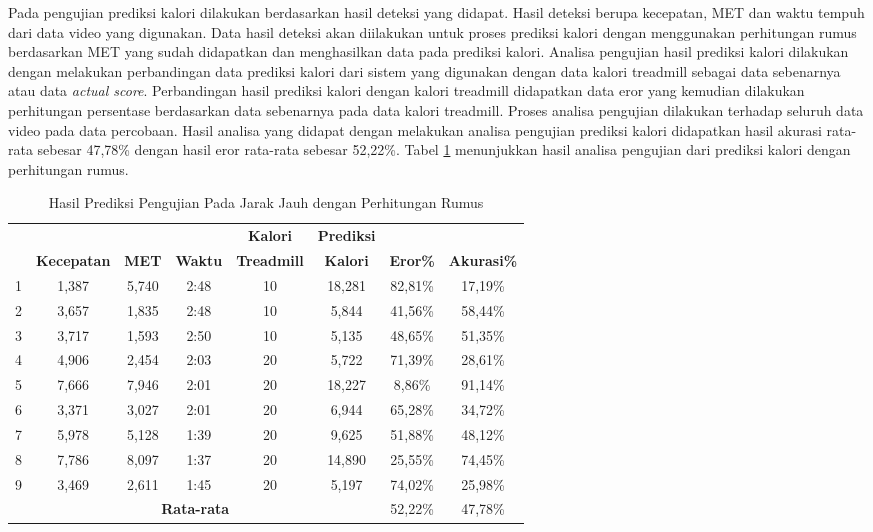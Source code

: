 Pada pengujian prediksi kalori dilakukan berdasarkan hasil deteksi yang didapat. Hasil deteksi berupa kecepatan, MET dan waktu tempuh dari data video yang digunakan. Data hasil deteksi akan diilakukan untuk proses prediksi kalori dengan menggunakan perhitungan rumus berdasarkan MET yang sudah didapatkan dan menghasilkan data pada prediksi kalori. Analisa pengujian hasil prediksi kalori dilakukan dengan melakukan perbandingan data prediksi kalori dari sistem yang digunakan dengan data kalori treadmill sebagai data sebenarnya atau data \emph{actual score}. Perbandingan hasil prediksi kalori dengan kalori treadmill didapatkan data eror yang kemudian dilakukan perhitungan persentase berdasarkan data sebenarnya pada data kalori treadmill. Proses analisa pengujian dilakukan terhadap seluruh data video pada data percobaan. Hasil analisa yang didapat dengan melakukan analisa pengujian prediksi kalori didapatkan hasil akurasi rata-rata sebesar 47,78\% dengan hasil eror rata-rata sebesar 52,22\%. Tabel \ref{tb:PengujianJarakJauhAnalisaPrediksiPerhitungan} menunjukkan hasil analisa pengujian dari prediksi kalori dengan perhitungan rumus.

\begin{longtable}{|c|c|c|c|c|c|c|c|}
  \caption{Hasil Prediksi Pengujian Pada Jarak Jauh dengan Perhitungan Rumus}
  \label{tb:PengujianJarakJauhAnalisaPrediksiPerhitungan}                                   \\
  \hline
  \rowcolor[HTML]{C0C0C0}
  & & & & \textbf{Kalori} & \textbf{Prediksi} & & \\
  \rowcolor[HTML]{C0C0C0}
  \multirow{-2}{*}{\textbf{Percobaan}} & \multirow{-2}{*}{\textbf{Kecepatan}} & \multirow{-2}{*}{\textbf{MET}} & \multirow{-2}{*}{\textbf{Waktu}} & \textbf{Treadmill} & \textbf{Kalori} & \multirow{-2}{*}{\textbf{Eror\%}} & \multirow{-2}{*}{\textbf{Akurasi\%}} \\
  \hline
  1   & 1,387   & 5,740    & 2:48    & 10   & 18,281   & 82,81\%     & 17,19\%   \\
  \hline
  2   & 3,657   & 1,835    & 2:48    & 10   & 5,844    & 41,56\%     & 58,44\%   \\
  \hline
  3   & 3,717   & 1,593    & 2:50    & 10   & 5,135    & 48,65\%     & 51,35\%   \\
  \hline
  4   & 4,906   & 2,454    & 2:03    & 20   & 5,722    & 71,39\%     & 28,61\%   \\
  \hline
  5   & 7,666   & 7,946    & 2:01    & 20   & 18,227   & 8,86\%      & 91,14\%   \\
  \hline
  6   & 3,371   & 3,027    & 2:01    & 20   & 6,944    & 65,28\%     & 34,72\%   \\
  \hline
  7   & 5,978   & 5,128    & 1:39    & 20   & 9,625    & 51,88\%     & 48,12\%   \\
  \hline
  8   & 7,786   & 8,097    & 1:37    & 20   & 14,890   & 25,55\%     & 74,45\%   \\
  \hline
  9   & 3,469   & 2,611    & 1:45    & 20   & 5,197    & 74,02\%     & 25,98\%   \\
  \hline

  \multicolumn{6}{|c|}{\textbf{Rata-rata}} & 52,22\% & 47,78\%  \\
  \hline
\end{longtable}


